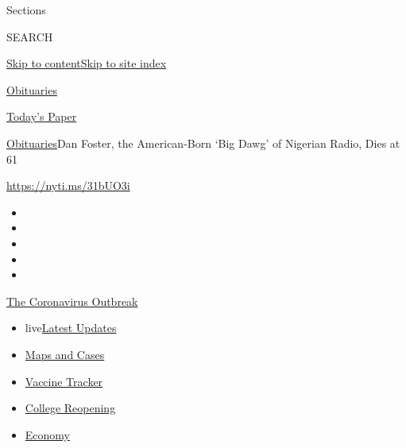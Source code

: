 Sections

SEARCH

\protect\hyperlink{site-content}{Skip to
content}\protect\hyperlink{site-index}{Skip to site index}

\href{https://www.nytimes3xbfgragh.onion/section/obituaries}{Obituaries}

\href{https://myaccount.nytimes3xbfgragh.onion/auth/login?response_type=cookie\&client_id=vi}{}

\href{https://www.nytimes3xbfgragh.onion/section/todayspaper}{Today's
Paper}

\href{/section/obituaries}{Obituaries}\textbar{}Dan Foster, the
American-Born `Big Dawg' of Nigerian Radio, Dies at 61

\url{https://nyti.ms/31bUO3i}

\begin{itemize}
\item
\item
\item
\item
\item
\end{itemize}

\href{https://www.nytimes3xbfgragh.onion/news-event/coronavirus?action=click\&pgtype=Article\&state=default\&region=TOP_BANNER\&context=storylines_menu}{The
Coronavirus Outbreak}

\begin{itemize}
\tightlist
\item
  live\href{https://www.nytimes3xbfgragh.onion/2020/08/04/world/coronavirus-covid-19.html?action=click\&pgtype=Article\&state=default\&region=TOP_BANNER\&context=storylines_menu}{Latest
  Updates}
\item
  \href{https://www.nytimes3xbfgragh.onion/interactive/2020/us/coronavirus-us-cases.html?action=click\&pgtype=Article\&state=default\&region=TOP_BANNER\&context=storylines_menu}{Maps
  and Cases}
\item
  \href{https://www.nytimes3xbfgragh.onion/interactive/2020/science/coronavirus-vaccine-tracker.html?action=click\&pgtype=Article\&state=default\&region=TOP_BANNER\&context=storylines_menu}{Vaccine
  Tracker}
\item
  \href{https://www.nytimes3xbfgragh.onion/2020/08/02/us/covid-college-reopening.html?action=click\&pgtype=Article\&state=default\&region=TOP_BANNER\&context=storylines_menu}{College
  Reopening}
\item
  \href{https://www.nytimes3xbfgragh.onion/live/2020/08/03/business/stock-market-today-coronavirus?action=click\&pgtype=Article\&state=default\&region=TOP_BANNER\&context=storylines_menu}{Economy}
\end{itemize}

